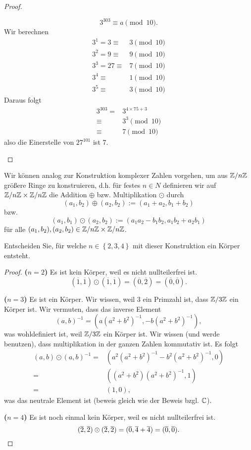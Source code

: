 \begin{proof}
\begin{parts}
		\[
			3^{303}\equiv a\pmod{10}
		.\] 
		Wir berechnen
		\begin{align*}
			3^1=3\equiv& 3\pmod{10}\\
			3^2=9\equiv& 9\pmod{10}\\
			3^3=27\equiv& 7\pmod{10}\\
			3^4\equiv& 1\pmod{10}\\
			3^5\equiv& 3\pmod{10}
		\end{align*}
		Daraus folgt
		\begin{align*}
			3^{303}=& 3^{4 \times 75+3}\\
			\equiv& 3^3\pmod{10}\\
			\equiv& 7\pmod{10}
		\end{align*}
		also die Einerstelle von $27^{101}$ ist $7$.\qedhere
	\end{parts}
\end{proof}
\begin{Problem}
	Wir können analog zur Konstruktion komplexer Zahlen vorgehen, um aus $\mathbb{Z} / n\mathbb{Z}$ größere Ringe zu konstruieren, d.h. für festes  $n\in N$ definieren wir auf $\mathbb{Z} / n \mathbb{Z}\times \mathbb{Z} / n \mathbb{Z}$ die Addition $\oplus$ bzw. Multiplikation $\odot$ durch
	\[
		(a_1,b_2)\oplus (a_2,b_2):=(a_1+a_2,b_1+b_2)
	\]
	bzw.
	\[
		(a_1,b_1)\odot (a_2,b_2):=(a_1a_2-b_1b_2,a_1b_2+a_2b_1)
	\]
	f\"{u}r alle $(a_1,b_2),(a_2,b_2)\in \mathbb{Z} / n \mathbb{Z} \times \mathbb{Z} / n \mathbb{Z}$. 

Entscheiden Sie, für welche $n\in \left\{ 2,3,4 \right\} $ mit dieser Konstruktion ein Körper entsteht. 
\end{Problem}
\begin{proof}
	\textbf{($n=2$)} Es ist kein Körper, weil es nicht nullteilerfrei ist.
	\[
		(\overline{1},\overline{1})\odot (\overline{1},\overline{1})=(\overline{0},\overline{2})=(\overline{0},\overline{0})
	.\] 

	\textbf{($n=3$)} Es ist ein Körper. Wir wissen, weil $3$ ein Primzahl ist, dass $\mathbb{Z} / 3\mathbb{Z}$ ein Körper ist. Wir vermuten, dass das inverse Element
	\[
		(a,b)^{-1}=\left( a\left(a^2+b^2  \right)^{-1},-b\left( a^2+b^2 \right)^{-1} \right) 
	,\] 
	was wohldefiniert ist, weil $\mathbb{Z} / 3\mathbb{Z}$ ein Körper ist. Wir wissen (und werde benutzen), dass multiplikation in der ganzen Zahlen kommutativ ist. Es folgt
	\begin{align*}
		(a,b)\odot (a,b)^{-1}=&\left( a^2\left( a^2+b^2 \right)^{-1}-b^2\left( a^2+b^2 \right)^{-1},0  \right) \\
		=&\left(\left( a^2+b^2 \right)\left( a^2+b^2 \right)^{-1},1  \right) \\
		=&\left( 1,0 \right), 
	\end{align*}
	was das neutrale Element ist (beweis gleich wie der Beweis bzgl. $\mathbb{C}$).

	\textbf{($n=4$)} Es ist noch einmal kein Körper, weil es nicht nullteilerfrei ist.
	\[
		(\overline{2},\overline{2})\odot (\overline{2},\overline{2})=(\overline{0},\overline{4}+\overline{4})=(\overline{0},\overline{0})
	.\qedhere\] 
\end{proof}

